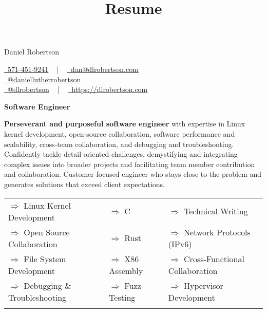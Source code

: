\documentclass[a4paper,skipsamekey,11pt,english]{curve}
\title{Resume}
\newcommand{\allTheInfo}[3]{
  \begin{center}
    {\Huge\color{red} #1} \hfill {
      \begin{minipage}{3in}
        #2
      \end{minipage}
    }
    \vspace{10pt}
    \begin{tcolorbox}[
      sharp corners,
      boxrule=0mm,
      enhanced,
      borderline north={1pt}{0pt}{blue},
      borderline south={1pt}{0pt}{blue},
      borderline west={0pt}{0pt}{base1!10},
      borderline east={0pt}{0pt}{base1!10},
    ]
      \begin{center}
        \vspace{-5pt}
        \Large{#3}
        \vspace{-5pt}
      \end{center}
    \end{tcolorbox}
  \end{center}
}
\newcommand{\makeSkillRow}[3]{
  {$\Rightarrow$#1} & {$\Rightarrow$#2} & {$\Rightarrow$#3}\\
}
\begin{document}
  \allTheInfo{
    Daniel Robertson
  }{
    \href{tel:5714519241}{
      \raisebox{-0.05\height} \faPhone\ 571-451-9241} ~ | ~
    \href{mailto:dan@dlrobertson.com}{
      \raisebox{-0.15\height} \faEnvelope\ dan@dlrobertson.com}\\
    \href{www.linkedin.com/in/daniellutherrobertson/ }{
      \raisebox{-0.15\height} \faLinkedin\ @daniellutherrobertson }\\
    \href{https://github.com/dlrobertson}{
      \raisebox{-0.15\height} \faGithub\ @dlrobertson} ~ | ~
    \href{https://dlrobertson.com}{
      \raisebox{-0.15\height} \faGlobe\ https://dlrobertson.com}
  }{
    \color{base03}\textbf{Software Engineer}
  }

  \textbf{Perseverant and purposeful software engineer} with expertise in Linux kernel
  development, open-source collaboration, software performance and scalability,
  cross-team collaboration, and debugging and troubleshooting. Confidently
  tackle detail-oriented challenges, demystifying and integrating complex
  issues into broader projects and facilitating team member contribution and
  collaboration. Customer-focused engineer who stays close to the problem and
  generates solutions that exceed client expectations.
  \begin{center}
    \setlength{\tabcolsep}{1em}
    \begin{tabular}{ l l l }
      \makeSkillRow{
        Linux Kernel Development
      }{
        C
      }{
        Technical Writing
      }
      \makeSkillRow{
        Open Source Collaboration
      }{
        Rust
      }{
        Network Protocols (IPv6)
      }
      \makeSkillRow{
        File System Development
      }{
        X86 Assembly
      }{
        Cross-Functional Collaboration
      }
      \makeSkillRow{
        Debugging \& Troubleshooting
      }{
        Fuzz Testing
      }{
        Hypervisor Development
      }\\
    \end{tabular}
  \end{center}
\end{document}
